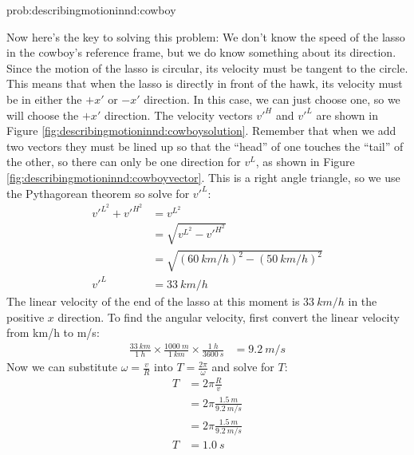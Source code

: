 \begin{solution}{prob:describingmotioninnd:cowboy}
\begin{enumerate}[label=\alph*)]
Now here's the key to solving this problem: We don't know the speed of the lasso in the cowboy's reference frame, but we do know something about its direction. Since the motion of the lasso is circular, its velocity must be tangent to the circle. This means that when the lasso is directly in front of the hawk, its velocity must be in either the $+x'$ or $-x'$ direction. In this case, we can just choose one, so we will choose the $+x'$ direction.
The velocity vectors $v'^H$ and $v'^L$ are shown in Figure \ref{fig:describingmotioninnd:cowboysolution}. Remember that when we add two vectors they must be lined up so that the ``head'' of one touches the ``tail'' of the other, so there can only be one direction for $v^L$, as shown in Figure \ref{fig:describingmotioninnd:cowboyvector}. 
This is a right angle triangle, so we use the Pythagorean theorem so solve for $v'^L$:
\begin{align*}
v'^{L^2}+v'^{H^2}&=v^{L^2}\\
&=\sqrt{v^{L^2}-v'^{H^2}}\\
&=\sqrt{(\SI{60}{km/h})^2-(\SI{50}{km/h})^2}\\
v'^L&=\SI{33}{km/h}
\end{align*}
The linear velocity of the end of the lasso at this moment is $\SI{33}{km/h}$ in the positive $x$ direction.  To find the angular velocity, first convert the linear velocity from km/h to m/s:
\begin{align*}
\frac{\SI{33}{km}}{\SI{1}{h}}\times \frac{\SI{1000}{m}}{\SI{1}{km}} \times \frac{\SI{1}{h}}{\SI{3600}{s}} &= \SI{9.2}{m/s}
\end{align*}     
Now we can substitute $\omega=\frac{v}{R}$ into $T=\frac{2\pi}{\omega}$ and solve for $T$:
\begin{align*}
T&={2\pi}\frac{R}{v}\\
&={2\pi}\frac{\SI{1.5}{m}}{\SI{9.2}{m/s}}\\
&={2\pi}\frac{\SI{1.5}{m}}{\SI{9.2}{m/s}}\\
T&=\SI{1.0}{s}
\end{align*}

\end{enumerate}
\end{solution}
